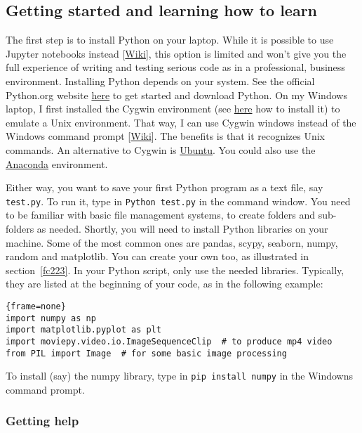 \documentclass[oneside,10pt]{book}
\begin{document}
\subsection{Getting started and learning how to learn}\label{staerqlk}

The first step is to install Python on your laptop. While it is possible to use Jupyter notebooks instead [\href{https://jupyter.org/}{Wiki}], this option is limited and won't give you the full experience of writing and testing serious code as in a professional, business environment. Installing Python depends on your system. See the official Python.org website \href{https://www.python.org/downloads/}{here} to get started and download Python. On my Windows laptop, I first installed the Cygwin environment (see \href{https://www.cygwin.com/}{here} how to install it) to emulate a Unix environment. That way, I can use Cygwin windows instead of the Windows command prompt [\href{https://en.wikipedia.org/wiki/Cmd.exe}{Wiki}]. The benefits is that it recognizes Unix commands. An alternative to Cygwin is
\href{https://ubuntu.com/download}{Ubuntu}. You could also use the \href{https://www.anaconda.com/products/distribution}{Anaconda} environment. 

Either way, you want to save your first Python program as a text file, say \texttt{test.py}. To run it, type in \texttt{Python test.py} in the command window. You need to be familiar with basic file management systems, to create folders and sub-folders as needed. Shortly, you will need to install Python libraries on your machine. Some of the  most common ones are pandas, scypy, seaborn, numpy, random and matplotlib. You can create your own too, as illustrated in section~\ref{fc223}. In your Python script, only use the needed libraries. Typically, they are listed at the beginning of your code, as in the following example:

\begin{lstlisting}{frame=none}
import numpy as np
import matplotlib.pyplot as plt
import moviepy.video.io.ImageSequenceClip  # to produce mp4 video
from PIL import Image  # for some basic image processing 
\end{lstlisting}

\noindent To install (say) the numpy library, type in \texttt{pip install numpy} in the Windowns command prompt. 

\subsubsection{Getting help} 
\end{document}
